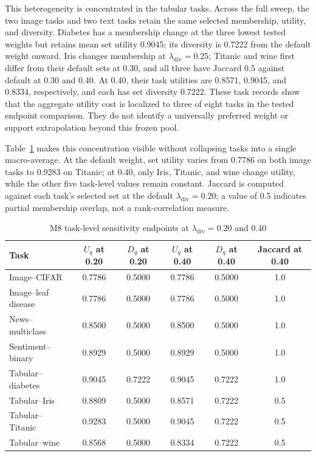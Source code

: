 \documentclass[conference]{IEEEtran}
\begin{document}
This heterogeneity is concentrated in the tabular tasks. Across the full sweep, the two image tasks and two text tasks retain the same selected membership, utility, and diversity. Diabetes has a membership change at the three lowest tested weights but retains mean set utility 0.9045; its diversity is 0.7222 from the default weight onward. Iris changes membership at $\lambda_{\mathrm{div}}=0.25$; Titanic and wine first differ from their default sets at 0.30, and all three have Jaccard 0.5 against default at 0.30 and 0.40. At 0.40, their task utilities are 0.8571, 0.9045, and 0.8334, respectively, and each has set diversity 0.7222. These task records show that the aggregate utility cost is localized to three of eight tasks in the tested endpoint comparison. They do not identify a universally preferred weight or support extrapolation beyond this frozen pool.

Table~\ref{tab:task-sensitivity} makes this concentration visible without collapsing tasks into a single macro-average. At the default weight, set utility varies from 0.7786 on both image tasks to 0.9283 on Titanic; at 0.40, only Iris, Titanic, and wine change utility, while the other five task-level values remain constant. Jaccard is computed against each task's selected set at the default $\lambda_{\mathrm{div}}=0.20$; a value of 0.5 indicates partial membership overlap, not a rank-correlation measure.

\begin{table}[!t]
\caption{M8 task-level sensitivity endpoints at $\lambda_{\mathrm{div}}=0.20$ and $0.40$}
\label{tab:task-sensitivity}
\centering
\footnotesize
\begin{tabular}{lccccc}
\toprule
Task & $U_q$ at 0.20 & $D_q$ at 0.20 & $U_q$ at 0.40 & $D_q$ at 0.40 & Jaccard at 0.40\\
\midrule
Image--CIFAR & 0.7786 & 0.5000 & 0.7786 & 0.5000 & 1.0\\
Image--leaf disease & 0.7786 & 0.5000 & 0.7786 & 0.5000 & 1.0\\
News--multiclass & 0.8500 & 0.5000 & 0.8500 & 0.5000 & 1.0\\
Sentiment--binary & 0.8929 & 0.5000 & 0.8929 & 0.5000 & 1.0\\
Tabular--diabetes & 0.9045 & 0.7222 & 0.9045 & 0.7222 & 1.0\\
Tabular--Iris & 0.8809 & 0.5000 & 0.8571 & 0.7222 & 0.5\\
Tabular--Titanic & 0.9283 & 0.5000 & 0.9045 & 0.7222 & 0.5\\
Tabular--wine & 0.8568 & 0.5000 & 0.8334 & 0.7222 & 0.5\\
\bottomrule
\end{tabular}
\end{table}
\end{document}
